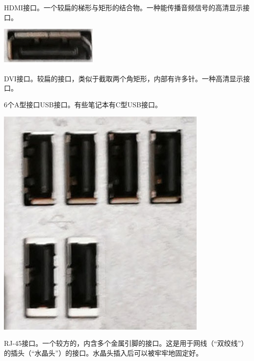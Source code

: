 HDMI接口。一个较扁的梯形与矩形的结合物。一种能传播音频信号的高清显示接口。
\begin{center}
	\includegraphics{pic/HDMI}
\end{center}\par
DVI接口。较扁的接口，类似于截取两个角矩形，内部有许多针。一种高清显示接口。\par
6个A型接口USB接口。有些笔记本有C型USB接口。
\begin{center}
	\includegraphics[scale=0.3]{pic/USB}
\end{center}\par
RJ-45接口。一个较方的，内含多个金属引脚的接口。这是用于网线（“双绞线”）的插头（“水晶头”）的接口。水晶头插入后可以被牢牢地固定好。
